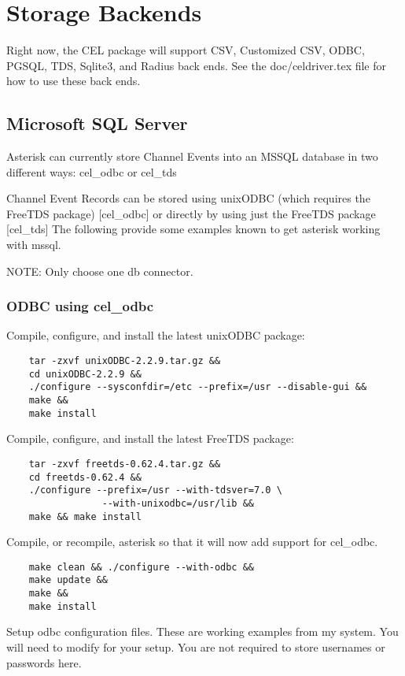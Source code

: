 \section{Storage Backends}

Right now, the CEL package will support CSV, Customized CSV, ODBC, PGSQL, TDS,
Sqlite3, and Radius back ends.  See the doc/celdriver.tex file
for how to use these back ends.

\subsection{Microsoft SQL Server}

	Asterisk can currently store Channel Events into an MSSQL database in
	two different ways:  cel_odbc or cel_tds

	Channel Event Records can be stored using unixODBC (which requires
	the FreeTDS package) [cel_odbc] or directly by using just the
	FreeTDS package [cel_tds]  The following provide some
	examples known to get asterisk working with mssql.

	NOTE:  Only choose one db connector.

\subsubsection{ODBC using cel_odbc}
	Compile, configure, and install the latest unixODBC package:
\begin{verbatim}
	tar -zxvf unixODBC-2.2.9.tar.gz &&
	cd unixODBC-2.2.9 &&
	./configure --sysconfdir=/etc --prefix=/usr --disable-gui &&
	make &&
	make install
\end{verbatim}

	Compile, configure, and install the latest FreeTDS package:
\begin{verbatim}
	tar -zxvf freetds-0.62.4.tar.gz &&
	cd freetds-0.62.4 &&
	./configure --prefix=/usr --with-tdsver=7.0 \
                 --with-unixodbc=/usr/lib &&
	make && make install
\end{verbatim}

	Compile, or recompile, asterisk so that it will now add support
	for cel_odbc.
\begin{verbatim}
	make clean && ./configure --with-odbc &&
	make update &&
	make &&
	make install
\end{verbatim}

	Setup odbc configuration files.  These are working examples
	from my system.  You will need to modify for your setup.
	You are not required to store usernames or passwords here.

